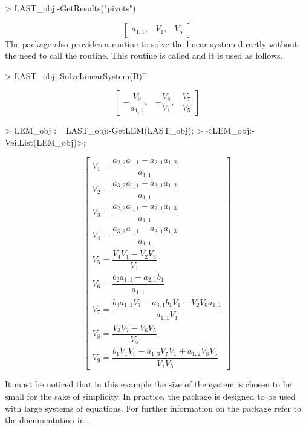 \begin{example}
  \begin{mapleinline}
> LAST_obj:-GetResults("pivots")
  \end{mapleinline}
  \begin{equation*}
    \begin{bmatrix}
      a_{1,1}, & V_{1}, & V_{5}
    \end{bmatrix}
  \end{equation*}
  The \LAST{} package also provides a routine to solve the linear system directly without the need to call the  routine. This routine is called  and it is used as follows.
  \begin{mapleinline}
> LAST_obj:-SolveLinearSystem(B)^%
  \end{mapleinline}
  \begin{equation*}
    \begin{bmatrix}
      -\dfrac{V_{9}}{a_{1,1}}, &
      -\dfrac{V_{8}}{V_{1}}, &
      \dfrac{V_{7}}{V_{5}}
    \end{bmatrix}
  \end{equation*}
  \begin{mapleinline}
> LEM_obj := LAST_obj:-GetLEM(LAST_obj);
> <LEM_obj:-VeilList(LEM_obj)>;
  \end{mapleinline}
  \begin{equation*}
    \begin{bmatrix}
      V_{1} = \dfrac{a_{2,2}a_{1,1}-a_{2,1}a_{1,2}}{a_{1,1}} \\
      V_{2} = \dfrac{a_{3,2}a_{1,1}-a_{3,1}a_{1,2}}{a_{1,1}} \\
      V_{3} = \dfrac{a_{2,3}a_{1,1}-a_{2,1}a_{1,3}}{a_{1,1}} \\
      V_{4} = \dfrac{a_{3,3}a_{1,1}-a_{3,1}a_{1,3}}{a_{1,1}} \\
      V_{5} = \dfrac{V_{4}V_{1}-V_{2}V_{3}}{V_{1}} \\
      V_{6} = \dfrac{b_{2}a_{1,1}-a_{2,1}b_{1}}{a_{1,1}} \\
      V_{7} = \dfrac{b_{3}a_{1,1}V_{1}-a_{3,1}b_{1}V_{1}-V_{2}V_{6}a_{1,1}}{a_{1,1}V_{1}} \\
      V_{8} = \dfrac{V_{3}V_{7}-V_{6}V_{5}}{V_{5}} \\
      V_{9} = \dfrac{b_{1}V_{1}V_{5}-a_{1,3}V_{7}V_{1}+a_{1,2}V_{8}V_{5}}{V_{1}V_{5}}
    \end{bmatrix}
  \end{equation*}

  It must be noticed that in this example the size of the system is chosen to be small for the sake of simplicity. In practice, the \LAST{} package is designed to be used with large systems of equations. For further information on the \LAST{} package refer to the documentation in~\cite{last}.
\end{example}
